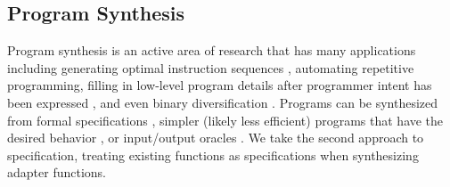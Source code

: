 \subsection{Program Synthesis}
%
Program synthesis is an active area of research that has many applications including generating optimal instruction sequences \cite{Massalin:1987:SLS:36206.36194,Joshi:2002:DGS:512529.512566}, automating repetitive programming, filling in low-level program details after programmer intent has been expressed \cite{Solar-LezamaTBSS2006}, and even binary diversification \cite{Jacob2008}. 
%
Programs can be synthesized from formal specifications \cite{Manna:1980:DAP:357084.357090}, simpler (likely less efficient) programs that have the desired behavior \cite{Massalin:1987:SLS:36206.36194,Solar-LezamaTBSS2006,Joshi:2002:DGS:512529.512566}, or input/output oracles \cite{Jha:2010:OCP:1806799.1806833}. 
%
We take the second approach to specification, treating existing functions as specifications when synthesizing adapter functions.
%
% 
% 
% 
